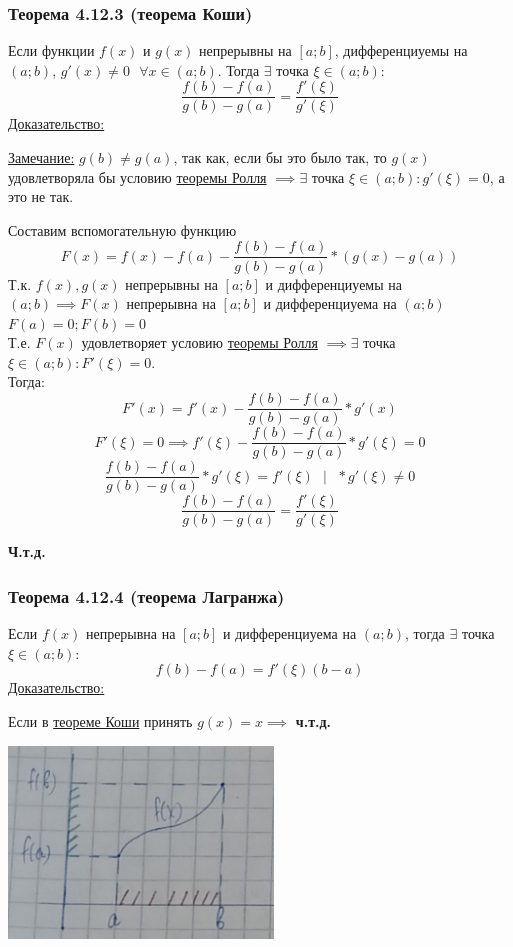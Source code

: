 \documentclass[12pt]{article}
\begin{document}
    \subsubsection*{Теорема 4.12.3 (теорема Коши)}\label{th:4.12.3}
    Если функции $f(x)$ и $g(x)$ непрерывны на $[a;b]$, дифференциуемы на $(a;b)$, $g'(x) \ne 0 \text{ } \forall x \in (a;b)$. Тогда $\exists$ точка $\xi \in (a;b)$:
    \[ \frac{f(b) - f(a)}{g(b) - g(a)} = \frac{f'(\xi)}{g'(\xi)} \]
    \underline{Доказательство:}
    \begin{adjustwidth}{1.5em}{1.5em}
        \underline{Замечание:} $g(b) \ne g(a)$, так как, если бы это было так, то $g(x)$ удовлетворяла бы условию \hyperref[th:4.12.2]{теоремы Ролля} $\implies \exists$ точка $\xi \in (a;b) : g'(\xi) = 0$, а это не так.\par\noindent
        Составим вспомогательную функцию
        \[ F(x) = f(x) - f(a) - \frac{f(b) - f(a)}{g(b) - g(a)} * (g(x) - g(a)) \]
        Т.к. $f(x), g(x)$ непрерывны на $[a;b]$ и дифференциуемы на $(a;b) \implies F(x)$ непрерывна на $[a;b]$ и дифференциуема на $(a;b)$\\
        $F(a) = 0; F(b) = 0$\\
        Т.е. $F(x)$ удовлетворяет условию \hyperref[th:4.12.2]{теоремы Ролля} $\implies \exists$ точка $\xi \in (a;b) : F'(\xi) = 0$.\\
        Тогда:
        \[ F'(x) = f'(x) - \frac{f(b) - f(a)}{g(b) - g(a)} * g'(x) \]
        \[ F'(\xi) = 0 \implies f'(\xi) - \frac{f(b) - f(a)}{g(b) - g(a)} * g'(\xi) = 0 \]
        \[ \frac{f(b) - f(a)}{g(b) - g(a)} * g'(\xi) = f'(\xi) \text{ } \big| \text{ } * g'(\xi) \ne 0 \]
        \[ \frac{f(b) - f(a)}{g(b) - g(a)} = \frac{f'(\xi)}{g'(\xi)} \]
        \begin{center}
            \textbf{Ч.т.д.}
        \end{center}
    \end{adjustwidth}
    
    \subsubsection*{Теорема 4.12.4 (теорема Лагранжа)}\label{th:4.12.4}
    Если $f(x)$ непрерывна на $[a;b]$ и дифференциуема на $(a;b)$, тогда $\exists$ точка $\xi \in (a; b)$: 
    \[ \boxed{f(b) - f(a) = f'(\xi)(b-a)} \]
    \underline{Доказательство:}
    \begin{adjustwidth}{1.5em}{1.5em}
        Если в \hyperref[th:4.12.3]{теореме Коши} принять $g(x) = x \implies$ \textbf{ч.т.д.}\par\noindent
        \includegraphics{4.12.2}
    \end{adjustwidth}
\end{document}
